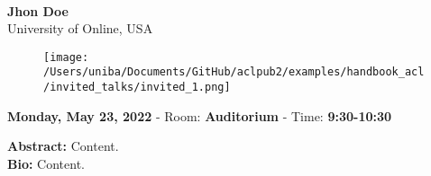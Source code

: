\leavevmode\newline \leavevmode\newline
{\centering
{}\\  \vspace*{-0.1cm} \leavevmode\newline
{\normalsize \textbf{Jhon Doe}}\\
{\normalsize {University of Online, USA}}\\


\begin{figure}[h!]
  \centering
      \texttt{[image: /Users/uniba/Documents/GitHub/aclpub2/examples/handbook\_acl/invited\_talks/invited\_1.png]}
\end{figure}

 {\normalsize \textbf{Monday, May 23, 2022} -
 Room: \textbf{Auditorium} -
 Time: \textbf{9:30-10:30}\\\leavevmode\newline
 }
}

{\textbf{Abstract:}}
Content.\\

{\textbf{Bio:}}
Content.\\

\clearpage